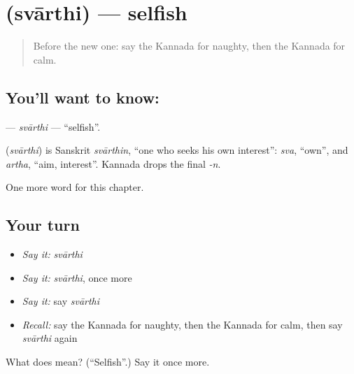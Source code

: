 \section[\texorpdfstring{\kn{ಸ್ವಾರ್ಥಿ} (svārthi)}{ಸ್ವಾರ್ಥಿ (svārthi)}]{ (svārthi) — selfish}

\label{lesson:KA-C255-svarthi}



\begin{quote}
Before the new one: say the Kannada for naughty, then the Kannada for calm.
\end{quote}

\subsection*{You'll want to know: }
\textbf{} — \emph{svārthi} — \textquotedblleft{}selfish\textquotedblright{}.

\begin{cousinweb}
\textbf{} (\emph{svārthi}) is Sanskrit \emph{svārthin}, \textquotedblleft{}one who seeks his own interest\textquotedblright{}: \emph{sva}, \textquotedblleft{}own\textquotedblright{}, and \emph{artha}, \textquotedblleft{}aim, interest\textquotedblright{}. Kannada drops the final \emph{-n}.
\end{cousinweb}

\begin{grammarlens}[title={What you've built}]
One more word for this chapter.
\end{grammarlens}

\subsection*{Your turn}
\begin{itemize}
\raggedright
  \item \emph{Say it:} \emph{svārthi}
  \item \emph{Say it:} \emph{svārthi}, once more
  \item \emph{Say it:} say \emph{svārthi}
  \item \emph{Recall:} say the Kannada for naughty, then the Kannada for calm, then say \emph{svārthi} again
\end{itemize}

\begin{tcolorbox}[breakable,colback=teal!4,colframe=teal!35!black,title={Before you move on}]
What does  mean? (\textquotedblleft{}Selfish\textquotedblright{}.) Say it once more.
\end{tcolorbox}

